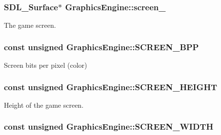 \hypertarget{classGraphicsEngine_a4d89c081a99c7512a070c9cb77809322}{
\subsubsection[{screen\-\_\-}]{\setlength{\rightskip}{0pt plus 5cm}S\-D\-L\-\_\-\-Surface$\ast$ Graphics\-Engine\-::screen\-\_\-\hspace{0.3cm}{\ttfamily [private]}}}\label{classGraphicsEngine_a4d89c081a99c7512a070c9cb77809322}


The game screen. 

\hypertarget{classGraphicsEngine_a3ff7024552553e73dd9edaef063284e0}{
\subsubsection[{S\-C\-R\-E\-E\-N\-\_\-\-B\-P\-P}]{\setlength{\rightskip}{0pt plus 5cm}const unsigned Graphics\-Engine\-::\-S\-C\-R\-E\-E\-N\-\_\-\-B\-P\-P\hspace{0.3cm}{\ttfamily [private]}}}\label{classGraphicsEngine_a3ff7024552553e73dd9edaef063284e0}


Screen bits per pixel (color) 

\hypertarget{classGraphicsEngine_a22ccc86caef4284dcf8600ef846e3897}{
\subsubsection[{S\-C\-R\-E\-E\-N\-\_\-\-H\-E\-I\-G\-H\-T}]{\setlength{\rightskip}{0pt plus 5cm}const unsigned Graphics\-Engine\-::\-S\-C\-R\-E\-E\-N\-\_\-\-H\-E\-I\-G\-H\-T\hspace{0.3cm}{\ttfamily [private]}}}\label{classGraphicsEngine_a22ccc86caef4284dcf8600ef846e3897}


Height of the game screen. 

\hypertarget{classGraphicsEngine_ac243d365dcf3e8a14f8ff1a838479429}{
\subsubsection[{S\-C\-R\-E\-E\-N\-\_\-\-W\-I\-D\-T\-H}]{\setlength{\rightskip}{0pt plus 5cm}const unsigned Graphics\-Engine\-::\-S\-C\-R\-E\-E\-N\-\_\-\-W\-I\-D\-T\-H\hspace{0.3cm}{\ttfamily [private]}}}\label{classGraphicsEngine_ac243d365dcf3e8a14f8ff1a838479429}


